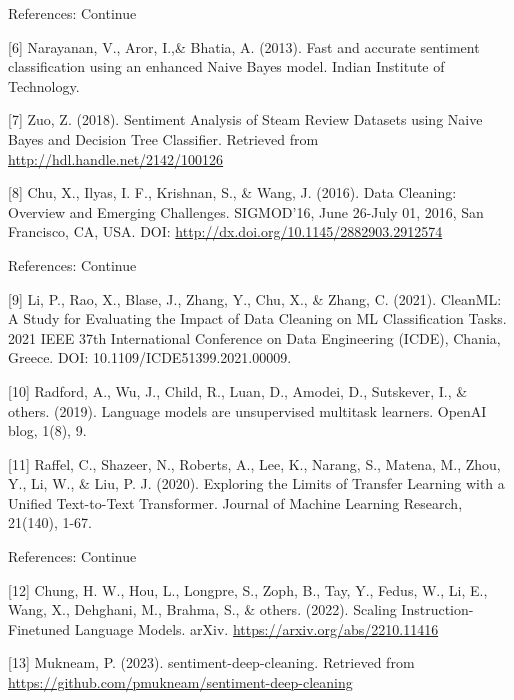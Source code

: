 \documentclass{beamer}
\begin{document}
\begin{frame}{References: Continue}

[6] Narayanan, V., Aror, I.,\& Bhatia, A. (2013). Fast and accurate sentiment classification using an enhanced Naive Bayes model. Indian Institute of Technology.

[7] Zuo, Z. (2018). Sentiment Analysis of Steam Review Datasets using Naive Bayes and Decision Tree Classifier. Retrieved from \url{http://hdl.handle.net/2142/100126}

[8] Chu, X., Ilyas, I. F., Krishnan, S., \& Wang, J. (2016). Data Cleaning: Overview and Emerging Challenges. SIGMOD’16, June 26-July 01, 2016, San Francisco, CA, USA. DOI: \url{http://dx.doi.org/10.1145/2882903.2912574}



    
\end{frame}

\begin{frame}{References: Continue}


[9] Li, P., Rao, X., Blase, J., Zhang, Y., Chu, X., \& Zhang, C. (2021). CleanML: A Study for Evaluating the Impact of Data Cleaning on ML Classification Tasks. 2021 IEEE 37th International Conference on Data Engineering (ICDE), Chania, Greece. DOI: 10.1109/ICDE51399.2021.00009.

[10] Radford, A., Wu, J., Child, R., Luan, D., Amodei, D., Sutskever, I., \& others. (2019). Language models are unsupervised multitask learners. OpenAI blog, 1(8), 9.

[11] Raffel, C., Shazeer, N., Roberts, A., Lee, K., Narang, S., Matena, M., Zhou, Y., Li, W., \& Liu, P. J. (2020). Exploring the Limits of Transfer Learning with a Unified Text-to-Text Transformer. Journal of Machine Learning Research, 21(140), 1-67.

    
\end{frame}

\begin{frame}{References: Continue}


[12] Chung, H. W., Hou, L., Longpre, S., Zoph, B., Tay, Y., Fedus, W., Li, E., Wang, X., Dehghani, M., Brahma, S., \& others. (2022). Scaling Instruction-Finetuned Language Models. arXiv. \url{https://arxiv.org/abs/2210.11416}

[13] Mukneam, P. (2023). sentiment-deep-cleaning. Retrieved from \url{https://github.com/pmukneam/sentiment-deep-cleaning}
    
\end{frame}
\end{document}
